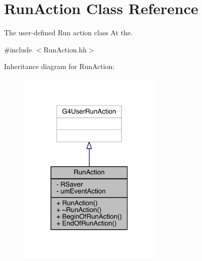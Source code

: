 \hypertarget{classRunAction}{}\section{Run\+Action Class Reference}
\label{classRunAction}


The user-\/defined Run action class At the.  




{\ttfamily \#include $<$Run\+Action.\+hh$>$}



Inheritance diagram for Run\+Action\+:
\nopagebreak
\begin{figure}[H]
\begin{center}
\leavevmode
\includegraphics[width=194pt]{classRunAction__inherit__graph}
\end{center}
\end{figure}


